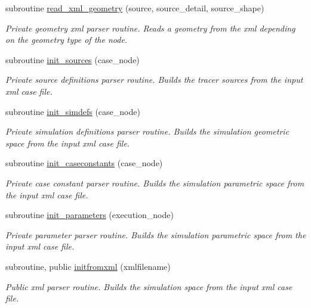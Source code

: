 \begin{DoxyCompactItemize}
subroutine \mbox{\hyperlink{namespacesimulationinitialize__mod_ab65ac868a57f2cc124ec29f87a239424}{read\+\_\+xml\+\_\+geometry}} (source, source\+\_\+detail, source\+\_\+shape)
\begin{DoxyCompactList}\small\item\em Private geometry xml parser routine. Reads a geometry from the xml depending on the geometry type of the node. \end{DoxyCompactList}\item 
subroutine \mbox{\hyperlink{namespacesimulationinitialize__mod_acaa6b217159e3a10e7db04dd7b0e4058}{init\+\_\+sources}} (case\+\_\+node)
\begin{DoxyCompactList}\small\item\em Private source definitions parser routine. Builds the tracer sources from the input xml case file. \end{DoxyCompactList}\item 
subroutine \mbox{\hyperlink{namespacesimulationinitialize__mod_af6b2508d52e9e29aeb6e7dfbabd88e8d}{init\+\_\+simdefs}} (case\+\_\+node)
\begin{DoxyCompactList}\small\item\em Private simulation definitions parser routine. Builds the simulation geometric space from the input xml case file. \end{DoxyCompactList}\item 
subroutine \mbox{\hyperlink{namespacesimulationinitialize__mod_ae41256ca5e72ebf27660ffdfe5c08e46}{init\+\_\+caseconstants}} (case\+\_\+node)
\begin{DoxyCompactList}\small\item\em Private case constant parser routine. Builds the simulation parametric space from the input xml case file. \end{DoxyCompactList}\item 
subroutine \mbox{\hyperlink{namespacesimulationinitialize__mod_a0b32e8c950fc615198d1e47ba1d36cd6}{init\+\_\+parameters}} (execution\+\_\+node)
\begin{DoxyCompactList}\small\item\em Private parameter parser routine. Builds the simulation parametric space from the input xml case file. \end{DoxyCompactList}\item 
subroutine, public \mbox{\hyperlink{namespacesimulationinitialize__mod_ada0310fe0d45fa2eec30deaf3ad25ba7}{initfromxml}} (xmlfilename)
\begin{DoxyCompactList}\small\item\em Public xml parser routine. Builds the simulation space from the input xml case file. \end{DoxyCompactList}\end{DoxyCompactItemize}


